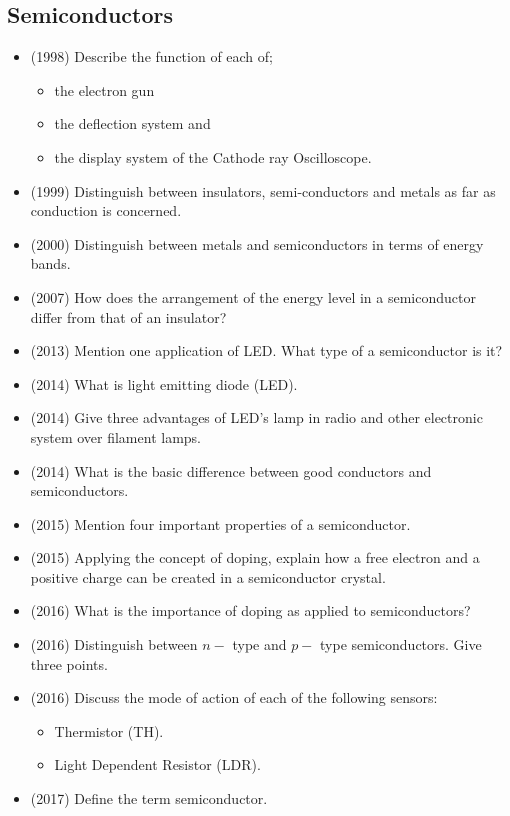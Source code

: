 \documentclass{article}
\begin{document}
\subsection{Semiconductors}
\begin{itemize}
\item (1998)  Describe the function of each of;
 \begin{itemize}
\item the electron gun
\item the deflection system and
\item the display system of the Cathode ray Oscilloscope.
\end{itemize}
\item (1999)  Distinguish between insulators, semi-conductors and metals as far as conduction is concerned.
\item (2000)  Distinguish between metals and semiconductors in terms of energy bands. 
\item (2007)  How does the arrangement of the energy level in a semiconductor differ from that of an insulator?
\item (2013)  Mention one application of LED. What type of a semiconductor is it?
\item (2014)  What is light emitting diode (LED).
\item (2014)  Give three advantages of LED's lamp in radio and other electronic system over filament lamps.
\item (2014)  What is the basic difference between good conductors and semiconductors.
\item (2015)  Mention four important properties of a semiconductor.
\item (2015)  Applying the concept of doping, explain how a free electron and a positive charge can be created in a semiconductor crystal. 
\item (2016)  What is the importance of doping as applied to semiconductors?
\item (2016)  Distinguish between $ n-$ type and $ p-$ type semiconductors.  Give three points.
\item (2016)  Discuss the mode of action of each of the following sensors:
 \begin{itemize}
\item Thermistor (TH).
\item Light Dependent Resistor (LDR).
\end{itemize}
\item (2017)  Define the term semiconductor.
 \begin{itemize}

\end{itemize}
\end{itemize}
\end{document}
